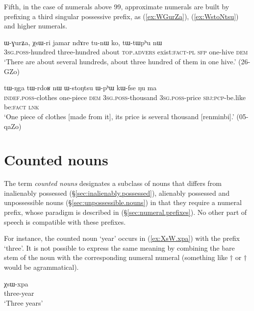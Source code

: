 Fifth, in the case of numerals above 99, approximate numerals are built by prefixing a third singular possessive  prefix, as  (\ref{ex:WGurZa}),  (\ref{ex:WstoNtsu}) and higher numerals.
 \largerpage
\begin{exe}
\ex \label{ex:WGurZa}
\gll  ɯ-ɣurʑa, χsɯ-ri jamar ndɤre tu-nɯ ko, tɯ-tɯpʰu nɯ  \\
\textsc{3sg}.\textsc{poss}-hundred three-hundred about \textsc{top}.\textsc{advers} exist:\textsc{fact}-\textsc{pl} \textsc{sfp} one-hive \textsc{dem} \\
\glt `There are about several hundreds, about three hundred of them in one hive.' (26-GZo)
\end{exe}

\begin{exe}
\ex \label{ex:WstoNtsu}
\gll  tɯ-ŋga tɯ-rdoʁ nɯ ɯ-stoŋtsu ɯ-pʰɯ kɯ-fse ŋu ma \\
\textsc{indef}.\textsc{poss}-clothes one-piece \textsc{dem} \textsc{3sg}.\textsc{poss}-thousand \textsc{3sg}.\textsc{poss}-price \textsc{sbj}:\textsc{pcp}-be.like be:\textsc{fact} \textsc{lnk} \\ 
\glt `One piece of clothes [made from it], its price is several thousand [renminbi].' (05-qaZo) 
\end{exe}

\section{Counted nouns} \label{sec:counted.nouns}
The term \textit{counted nouns} designates a subclass of nouns that differs from inalienably possessed (§\ref{sec:inalienably.possessed}), alienably possessed and unpossessible nouns (§\ref{sec:unpossessible.nouns}) in that they require a numeral prefix, whose paradigm is described in (§\ref{sec:numeral.prefixes}). No other part of speech is compatible with these prefixes.

For instance, the counted noun  `year' occurs in (\ref{ex:XsW.xpa}) with the prefix  `three'. It is not possible to express the same meaning by combining the bare stem of the noun  with the corresponding numeral numeral  (something  like  $\dagger$ or $\dagger$ would be agrammatical).

\begin{exe}
\ex \label{ex:XsW.xpa}
\gll χsɯ-xpa \\
three-year \\
\glt `Three years'
\end{exe}


